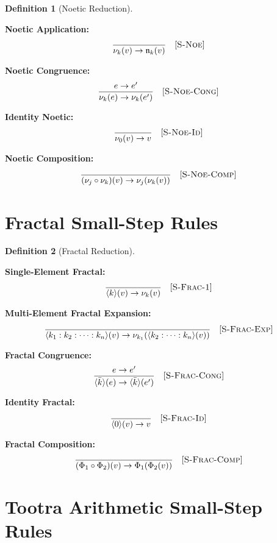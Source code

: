 \documentclass[11pt,twoside,openright]{book}
\theoremstyle{definition}
\newtheorem{definition}{Definition}[chapter]
\theoremstyle{plain}
\theoremstyle{remark}
\newcommand{\noe}[1]{\nu_{#1}}
\newcommand{\Frac}{\Phi}
\newcommand{\smallstep}{\to}
\begin{document}
\begin{definition}[Noetic Reduction]
\label{def:noetic-smallstep}

\textbf{Noetic Application:}
\[
\frac{}
{\noe{k}(v) \smallstep \mathfrak{n}_k(v)} \quad [\textsc{S-Noe}]
\]

\textbf{Noetic Congruence:}
\[
\frac{e \smallstep e'}
{\noe{k}(e) \smallstep \noe{k}(e')} \quad [\textsc{S-Noe-Cong}]
\]

\textbf{Identity Noetic:}
\[
\frac{}
{\noe{0}(v) \smallstep v} \quad [\textsc{S-Noe-Id}]
\]

\textbf{Noetic Composition:}
\[
\frac{}
{(\noe{j} \circ \noe{k})(v) \smallstep \noe{j}(\noe{k}(v))} \quad [\textsc{S-Noe-Comp}]
\]
\end{definition}

\section{Fractal Small-Step Rules}

\begin{definition}[Fractal Reduction]
\label{def:fractal-smallstep}

\textbf{Single-Element Fractal:}
\[
\frac{}
{\langle k \rangle(v) \smallstep \noe{k}(v)} \quad [\textsc{S-Frac-1}]
\]

\textbf{Multi-Element Fractal Expansion:}
\[
\frac{}
{\langle k_1 : k_2 : \cdots : k_n \rangle(v) \smallstep \noe{k_1}(\langle k_2 : \cdots : k_n \rangle(v))} \quad [\textsc{S-Frac-Exp}]
\]

\textbf{Fractal Congruence:}
\[
\frac{e \smallstep e'}
{\langle \bar{k} \rangle(e) \smallstep \langle \bar{k} \rangle(e')} \quad [\textsc{S-Frac-Cong}]
\]

\textbf{Identity Fractal:}
\[
\frac{}
{\langle 0 \rangle(v) \smallstep v} \quad [\textsc{S-Frac-Id}]
\]

\textbf{Fractal Composition:}
\[
\frac{}
{(\Frac_1 \circ \Frac_2)(v) \smallstep \Frac_1(\Frac_2(v))} \quad [\textsc{S-Frac-Comp}]
\]
\end{definition}

\section{Tootra Arithmetic Small-Step Rules}
\end{document}
